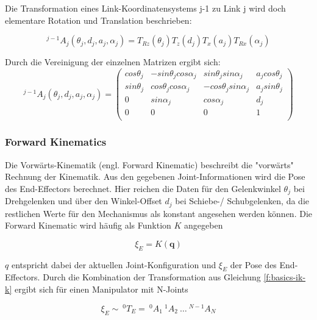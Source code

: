 Die Transformation eines Link-Koordinatensystems {j-1} zu Link {j} wird doch elementare Rotation und Translation beschrieben:

\begin{equation}
^{j-1}A_{j}(\theta_j,d_j,a_j,\alpha_j) = T_{Rz}(\theta_j)T_{z}(d_j)T_{x}(a_j)T_{Rx}(\alpha_j)
\label{f:basics-ik-k}
\end{equation}


Durch die Vereinigung der einzelnen Matrizen ergibt sich:
\begin{equation}
^{j-1}A_{j}(\theta_j,d_j,a_j,\alpha_j) = 
\begin{pmatrix}
cos \theta_j & -sin \theta_j cos \alpha_j & sin \theta_j sin \alpha_j  & a_j cos \theta_j\\
sin \theta_j & cos \theta_j cos \alpha_j & -cos \theta_j sin \alpha_j  & a_j sin\theta_j\\
0 			&sin \alpha_j 				& cos \alpha_j  & d_j\\
0 & 0 & 0& 1\\
\end{pmatrix}
\end{equation}

\subsubsection{Forward Kinematics}

Die Vorwärts-Kinematik (engl. Forward Kinematic) beschreibt die "vorwärts" Rechnung der Kinematik. Aus den gegebenen Joint-Informationen wird die Pose des End-Effectors berechnet. Hier reichen die Daten für den Gelenkwinkel $\theta_j$ bei Drehgelenken und über den Winkel-Offset $d_j$ bei Schiebe-/ Schubgelenken, da die restlichen Werte für den Mechanismus als konstant angesehen werden können. Die Forward Kinematic wird häufig als Funktion $K$ angegeben \cite{Corke2011}

\begin{equation}
\xi_E = K(\textbf{q})
\label{f1}
\end{equation}

$q$ entspricht dabei der aktuellen Joint-Konfiguration und $\xi_E$ der Pose des End-Effectors. Durch die Kombination der Transformation aus Gleichung \ref{f:basics-ik-k} ergibt sich für einen Manipulator mit N-Joints\cite{Corke2011}

\begin{equation}
\xi_E \sim \: ^0T_E =\: ^0A_1\:^1A_2 \:\dots\:^{N-1}A_N
\end{equation}

